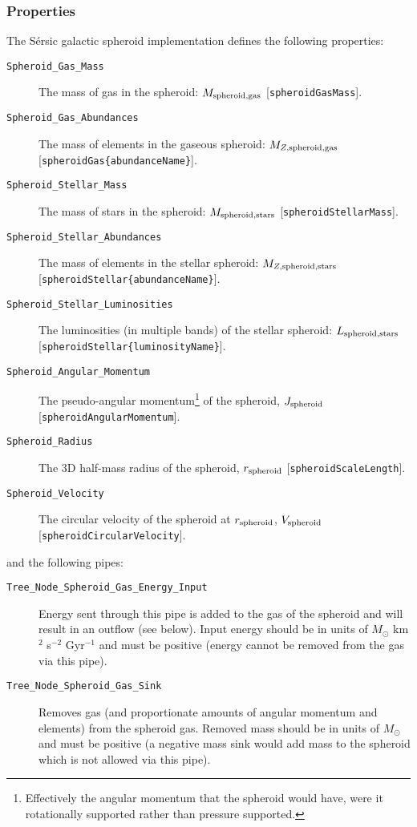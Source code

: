 \subsubsection{Properties}

The S\'ersic galactic spheroid implementation defines the following properties:
\begin{description}
 \item [{\tt Spheroid\_Gas\_Mass}] The mass of gas in the spheroid: $M_{\rm spheroid, gas}$ [{\tt spheroidGasMass}].
 \item [{\tt Spheroid\_Gas\_Abundances}] The mass of elements in the gaseous spheroid: $M_{Z, {\rm spheroid, gas}}$ [{\tt spheroidGas\{abundanceName\}}].
 \item [{\tt Spheroid\_Stellar\_Mass}] The mass of stars in the spheroid: $M_{\rm spheroid, stars}$ [{\tt spheroidStellarMass}].
 \item [{\tt Spheroid\_Stellar\_Abundances}] The mass of elements in the stellar spheroid: $M_{Z, {\rm spheroid, stars}}$ [{\tt spheroidStellar\{abundanceName\}}].
 \item [{\tt Spheroid\_Stellar\_Luminosities}] The luminosities (in multiple bands) of the stellar spheroid: $L_{\rm spheroid, stars}$ [{\tt spheroidStellar\{luminosityName\}}].
 \item [{\tt Spheroid\_Angular\_Momentum}] The pseudo-angular momentum\footnote{Effectively the angular momentum that the spheroid would have, were it rotationally supported rather than pressure supported.} of the spheroid, $J_{\rm spheroid}$ [{\tt spheroidAngularMomentum}].
 \item [{\tt Spheroid\_Radius}] The 3D half-mass radius of the spheroid, $r_{\rm spheroid}$ [{\tt spheroidScaleLength}].
 \item [{\tt Spheroid\_Velocity}] The circular velocity of the spheroid at $r_{\rm spheroid}$, $V_{\rm spheroid}$ [{\tt spheroidCircularVelocity}].
\end{description}
and the following pipes:
\begin{description}
 \item [{\tt Tree\_Node\_Spheroid\_Gas\_Energy\_Input}] Energy sent through this pipe is added to the gas of the spheroid and will result in an outflow (see below). Input energy should be in units of $M_\odot$ km$^2$ s$^{-2}$ Gyr$^{-1}$ and must be positive (energy cannot be removed from the gas via this pipe).
 \item [{\tt Tree\_Node\_Spheroid\_Gas\_Sink}] Removes gas (and proportionate amounts of angular momentum and elements) from the spheroid gas. Removed mass should be in units of $M_\odot$ and must be positive (a negative mass sink would add mass to the spheroid which is not allowed via this pipe).
\end{description}

